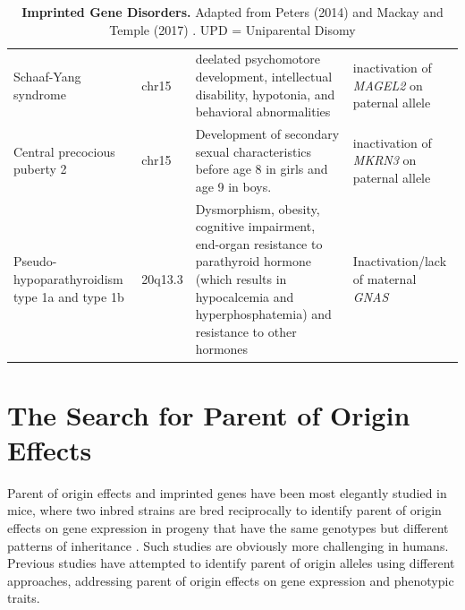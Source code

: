 \begin{table}
\begin{adjustbox}{width=1\textwidth}
\begin{tabular}{@{}p{3cm}p{2cm}p{7cm}p{7cm}@{}}
Schaaf-Yang syndrome\cite{Fountain:2017dd} & chr15  & deelated psychomotore development, intellectual disability, hypotonia, and behavioral abnormalities & inactivation of \emph{MAGEL2} on paternal allele\\
Central precocious puberty 2\cite{Abreu:2013je} & chr15 & Development of secondary sexual characteristics before age 8 in girls and age 9 in boys. & inactivation of \emph{MKRN3} on paternal allele\\
Pseudo-hypoparathyroidism type 1a and type 1b\cite{Mantovani:2016em,Elli:2016et}  & 20q13.3 & Dysmorphism, obesity, cognitive impairment, end-organ resistance to parathyroid hormone (which results in hypocalcemia and hyperphosphatemia) and resistance to other hormones & Inactivation/lack of maternal \emph{GNAS} \\ 

\bottomrule
\end{tabular}
\end{adjustbox}
\caption[Imprinted Gene Disorders.]{\textbf{Imprinted Gene Disorders.} Adapted from Peters (2014) and Mackay and Temple (2017) \cite{Peters2014,Mackay:2017kn}. UPD = Uniparental Disomy}
\label{tab:imprinteddisease}
\end{table}



\section{The Search for Parent of Origin Effects}


Parent of origin effects and imprinted genes have been most elegantly studied in mice, where two inbred strains are bred reciprocally to identify parent of origin effects on gene expression in progeny that have the same genotypes but different patterns of inheritance \cite{Babak2012}. Such studies are obviously more challenging in humans. Previous studies have attempted to identify parent of origin alleles using different approaches, addressing parent of origin effects on gene expression and phenotypic traits.

